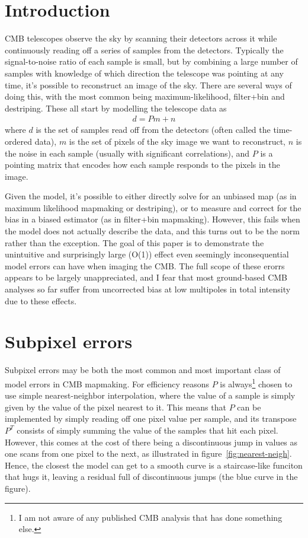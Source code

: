 \documentclass[twocolumn,apj]{aastex63}
\begin{document}
\section{Introduction}
CMB telescopes observe the sky by scanning their detectors across
it while continuously reading off a series of samples from the
detectors. Typically the signal-to-noise ratio of each sample is
small, but by combining a large number of samples with knowledge
of which direction the telescope was pointing at any time, it's
possible to reconstruct an image of the sky. There are several
ways of doing this, with the most common being maximum-likelihood,
filter+bin and destriping. These all start by modelling the
telescope data as
\begin{align}
	d = Pm + n
\end{align}
where $d$ is the set of samples read off from the detectors
(often called the time-ordered data), $m$ is the set of pixels
of the sky image we want to reconstruct, $n$ is the noise
in each sample (usually with significant correlations), and
$P$ is a pointing matrix that encodes how each sample responds
to the pixels in the image.

Given the model, it's possible to either directly solve for
an unbiased map (as in maximum likelihood mapmaking or destriping),
or to measure and correct for the bias in a biased estimator
(as in filter+bin mapmaking). However, this fails when the model
does not actually describe the data, and this turns out to be
the norm rather than the exception. The goal of this paper is to
demonstrate the unintuitive and surprisingly large (O(1)) effect
even seemingly inconsequential model errors can have when imaging
the CMB. The full scope of these erorrs appears to be largely
unappreciated, and I fear that most ground-based CMB analyses
so far suffer from uncorrected bias at low multipoles in total intensity
due to these effects.

\section{Subpixel errors}
Subpixel errors may be both the most common and most important
class of model errors in CMB mapmaking.
For efficiency reasons $P$ is always\footnote{I am not aware of any
published CMB analysis that has done something else.}
chosen to use simple nearest-neighbor interpolation, where the
value of a sample is simply given by the value of the pixel nearest
to it. This means that $P$ can be implemented by simply reading off
one pixel value per sample, and its transpose $P^T$ consists of simply
summing the value of the samples that hit each pixel. However, this
comes at the cost of there being a discontinuous jump in values as one
scans from one pixel to the next, as illustrated in figure~\ref{fig:nearest-neigh}.
Hence, the closest the model can get to a smooth curve is a
staircase-like funciton that hugs it, leaving a residual full of
discontinuous jumps (the blue curve in the figure).
\end{document}

